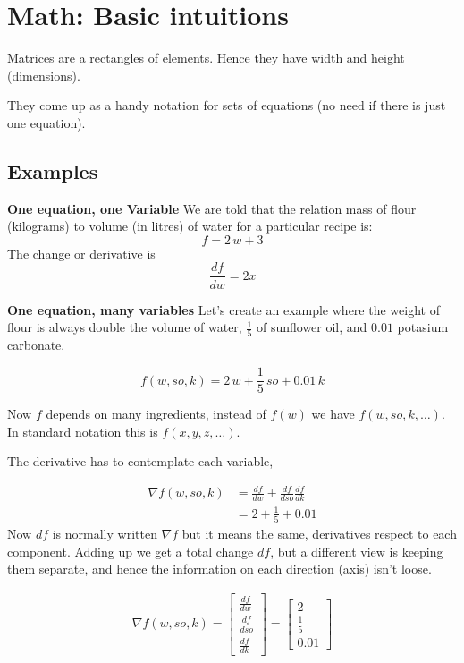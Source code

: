 \section{Math: Basic intuitions}
Matrices are a rectangles of elements. Hence they have width and height (dimensions).

They come up as a handy notation for sets of equations (no need if there is just one equation). 

\subsection{Examples}
\textbf{One equation, one Variable}
We are told that the relation mass of flour (kilograms) to volume (in litres) of water for a particular recipe is: $$f = 2\,w + 3$$
The change or derivative is $$\frac{df}{dw} = 2x$$

\textbf{One equation, many variables}
Let's create an example where the weight of flour is always double the volume of water, $\frac{1}{5}$ of sunflower oil, and $0.01$ potasium carbonate. 

$$f(w,so,k) = 2\,w + \frac{1}{5}\,so + 0.01\,k$$

Now $f$ depends on many ingredients, instead of $f(w)$ we have $f(w,so,k,\ldots)$. In standard notation this is $f(x,y,z,\ldots)$. 

The derivative has to contemplate each variable,

\begin{align*}
  \nabla f(w,so,k) &= \frac{df}{dw} + \frac{df}{dso} \frac{df}{dk}\\
&=2 + \frac{1}{5} + 0.01
\end{align*}
Now $df$ is normally written $\nabla f$ but it means the same, derivatives respect to each component. Adding up we get a total change $df$, but a different view is keeping them separate, and hence the information on each direction (axis) isn't loose.

\begin{align*}
\nabla f(w,so,k) =
\begin{bmatrix}
   \frac{df}{dw} \\ \frac{df}{dso} \\ \frac{df}{dk}
\end{bmatrix}
=
\begin{bmatrix}
  2 \\ \frac{1}{5} \\ 0.01
\end{bmatrix}
\end{align*}


